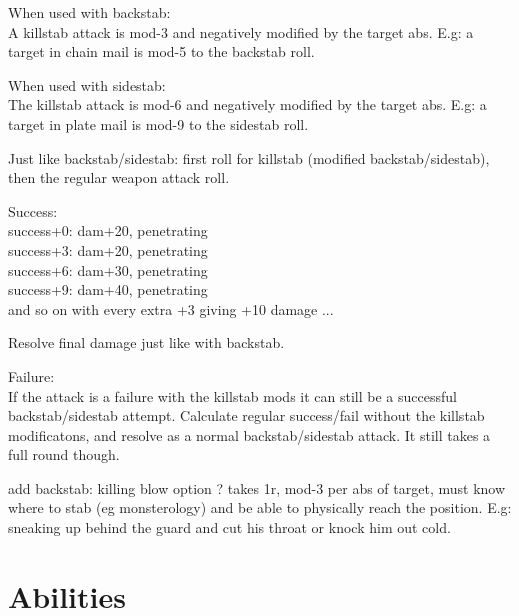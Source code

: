 When used with backstab:\\
A killstab attack is mod-3 and negatively modified by the target abs. E.g: a target in chain mail is mod-5 to the backstab roll.

When used with sidestab:\\
The killstab attack is mod-6 and negatively modified by the target abs. E.g: a target in plate mail is mod-9 to the sidestab roll.

Just like backstab/sidestab: first roll for killstab (modified backstab/sidestab), then the regular weapon attack roll. 

\noindent Success:\\
success+0: dam+20, penetrating\\
success+3: dam+20, penetrating\\
success+6: dam+30, penetrating\\
success+9: dam+40, penetrating\\
and so on with every extra +3 giving +10 damage ...

Resolve final damage just like with backstab.


\noindent Failure:\\
If the attack is a failure with the killstab mods it can still be a successful backstab/sidestab attempt. Calculate regular success/fail without the killstab modificatons, and resolve as a normal backstab/sidestab attack. It still takes a full round though.



\todo add backstab: killing blow option ?  takes 1r,  mod-3 per abs of target,  must know where to stab (eg monsterology) and be able to physically reach the position.
E.g: sneaking up behind the guard and cut his throat or knock him out cold.





\closeskillslist















\section*{Abilities}

